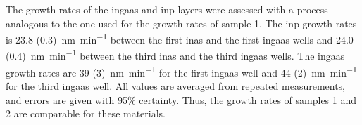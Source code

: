 The growth rates of the \acs{ingaas} and \acs{inp} layers were assessed with a process analogous to the one used for the growth rates of sample 1. The \acs{inp} growth rates is \qty[separate-uncertainty=true]{23.8 (0.3)}{\nano\metre\per\minute} between the first \acs{inas} and the first \acs{ingaas} wells and \qty[separate-uncertainty=true]{24.0 (0.4)}{\nano\metre\per\minute} between the third \acs{inas} and the third \acs{ingaas} wells. The \acs{ingaas} growth rates are \qty[separate-uncertainty=true]{39 (3)}{\nano\metre\per\minute} for the first \acs{ingaas} well and \qty[separate-uncertainty=true]{44 (2)}{\nano\metre\per\minute} for the third \acs{ingaas} well. All values are averaged from repeated measurements, and errors are given with 95\% certainty. Thus, the growth rates of samples 1 and 2 are comparable for these materials.




